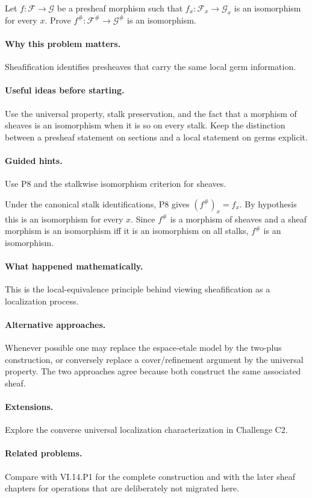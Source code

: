 \begin{problem}
Let $f:\mathcal F\to\mathcal G$ be a presheaf morphism such that $f_x:\mathcal F_x\to\mathcal G_x$ is an isomorphism for every $x$. Prove $f^\#:\mathcal F^\#\to\mathcal G^\#$ is an isomorphism.
\end{problem}

\paragraph{Why this problem matters.}
Sheafification identifies presheaves that carry the same local germ information.

\paragraph{Useful ideas before starting.}
Use the universal property, stalk preservation, and the fact that a morphism of sheaves is an isomorphism when it is so on every stalk.  Keep the distinction between a presheaf statement on sections and a local statement on germs explicit.

\paragraph{Guided hints.}
Use P8 and the stalkwise isomorphism criterion for sheaves.

\ifdefined\FullProblemDossiers
\begin{solution}
Under the canonical stalk identifications, P8 gives $(f^\#)_x=f_x$. By hypothesis this is an isomorphism for every $x$. Since $f^\#$ is a morphism of sheaves and a sheaf morphism is an isomorphism iff it is an isomorphism on all stalks, $f^\#$ is an isomorphism.
\end{solution}

\paragraph{What happened mathematically.}
This is the local-equivalence principle behind viewing sheafification as a localization process.

\paragraph{Alternative approaches.}
Whenever possible one may replace the espace-etale model by the two-plus construction, or conversely replace a cover/refinement argument by the universal property.  The two approaches agree because both construct the same associated sheaf.

\paragraph{Extensions.}
Explore the converse universal localization characterization in Challenge C2.

\paragraph{Related problems.}
Compare with VI.14.P1 for the complete construction and with the later sheaf chapters for operations that are deliberately not migrated here.
\fi
